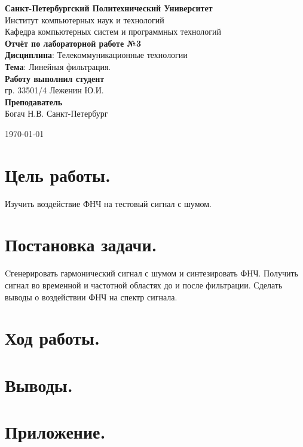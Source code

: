\documentclass[a4paper,14pt]{extarticle}
\DeclareMathOperator{\sinc}{sinc}
\begin{document}
\begin{titlepage}
\centering 
{\bfseries Санкт-Петербургский Политехнический Университет} \\
Институт компьютерных наук и технологий \\
Кафедра компьютерных систем и программных технологий \\
\vspace{5cm}
{\centering \textbf{Отчёт по лабораторной работе №3} \\ 
\vspace{0.15cm}
\textbf{Дисциплина}: Телекоммуникационные технологии \\
\vspace{0.15cm}
\textbf{Тема}: Линейная фильтрация.} \\
\vspace{4cm}
\hfill {\bfseries Работу выполнил студент}  \\
\hfill гр. 33501/4 Леженин Ю.И. \\
\hfill {\bfseries Преподаватель}  \\
\hfill Богач Н.В.
\vfill
Санкт-Петербург \\
{\large \today\par}
\end{titlepage}

\section{Цель работы.}

Изучить воздействие ФНЧ на тестовый сигнал с шумом.

\section{Постановка задачи.} 

Cгенерировать гармонический сигнал с шумом
и синтезировать ФНЧ. Получить сигнал во временной и частотной
областях до и после фильтрации. Сделать выводы о воздействии
ФНЧ на спектр сигнала.

\section{Ход работы.}


\section{Выводы.}

%
%
%

\section{Приложение.}


\end{document}
